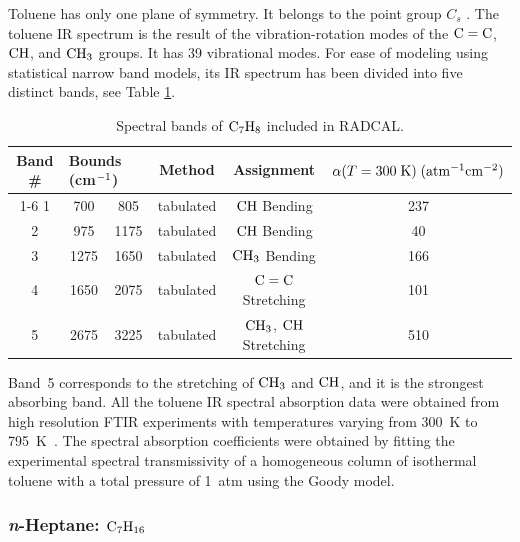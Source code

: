 Toluene has only one plane of symmetry. It belongs to the point group $C_{s}$ \cite{III2011}. The toluene IR spectrum is the result of the vibration-rotation modes of the $\rm C=C$, $\rm CH$, and $\rm CH_3$ groups. It has 39 vibrational modes. For ease of modeling using statistical narrow band models, its IR spectrum has been divided into five distinct bands, see Table \ref{Table::C7H8}.
\begin{table}[ht]
   \centering
   \caption[Spectral bands of $\rm C_7H_8$ included in RADCAL]{Spectral bands of $\rm C_7H_8$ included in RADCAL.}
   \vspace{0.1in}
   \label{Table::C7H8}
   \begin{tabular}{|c|c|c|c|c|c|}
    \hline
    Band \# & \multicolumn{2}{|l|}{Bounds (cm$\rm ^{-1}$) } & Method & Assignment & $\alpha(T=300 \; {\rm K}) \; (\rm {atm^{-1} cm^{-2}})$\\
    \cline{1-6}
    1 & 700  & 805  & tabulated &  $\rm CH$ Bending      & 237 \\
    2 & 975  & 1175 & tabulated &  $\rm CH$ Bending      & 40  \\
    3 & 1275 & 1650 & tabulated &  $\rm CH_3$ Bending    & 166 \\
    4 & 1650 & 2075 & tabulated &  $\rm C=C$ Stretching  & 101 \\
    5 & 2675 & 3225 & tabulated &  $\rm CH_3$, $\rm CH$  Stretching & 510  \\
    \hline
   \end{tabular}
\end{table}
Band~5 corresponds to the stretching of $\rm CH_3$ and $\rm CH$, and it is the strongest absorbing band. All the toluene IR spectral absorption data were obtained from high resolution FTIR experiments with temperatures varying from 300~K to 795~K~\cite{Wakatsuki:2005}. The spectral absorption coefficients were obtained by fitting the experimental spectral transmissivity of a homogeneous column of isothermal toluene with a total pressure of 1~atm using the Goody model.

\subsubsection{\textit{n}-Heptane: $\rm C_7H_{16}$}

